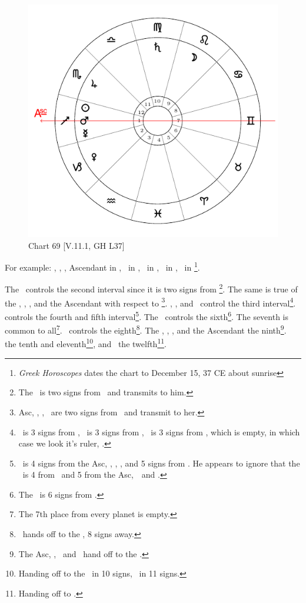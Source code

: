 \newpage
\begin{figure}
\centering
\vspace{0pt}
\includegraphics[width=.68\textwidth]{charts/5_11_1}
\caption{Chart 69 [V.11.1, GH L37]}
\label{fig:chart69}
\end{figure}

\noindent For example: \Sun, \Mars, \Mercury, Ascendant in \Sagittarius, \Moon\, in \Leo, \Saturn\, in \Virgo, \Jupiter\, in \Scorpio, \Venus\, in \Capricorn\footnote{\textit{Greek Horoscopes} dates the chart to December 15, 37 CE about sunrise}. 

The \Moon\, controls the second interval since it is two signs from \Saturn\footnote{The \Moon\, is two signs from \Saturn\, and transmits to him.}. The same is true of the \Sun, \Mars, \Mercury, and the Ascendant with respect to \Venus\footnote{Asc, \Sun, \Mars, \Mercury\, are two signs from \Venus\, and transmit to her.}. \Saturn, \Jupiter, and \Venus\, control the third interval\footnote{\Saturn\, is 3 signs from \Jupiter, \Jupiter\, is 3 signs from \Venus, \Venus\, is 3 signs from \Pisces, which is empty, in which case we look it's ruler, \Jupiter.}. \Saturn\, controls the fourth and fifth interval\footnote{\Saturn\, is 4 signs from the Asc, \Sun, \Mars, \Mercury, and 5 signs from \Venus. He appears to ignore that the \Moon\, is 4 from \Jupiter\, and 5 from the Asc, \Sun\, \Mercury\,and \Mars.}. The \Moon\, controls the sixth\footnote{The \Moon\, is 6  signs from \Venus.}. The seventh is common to all\footnote{The 7th place from every planet is empty.}. \Venus\, controls the eighth\footnote{\Venus\, hands off to the \Moon, 8 signs away.}. The \Sun, \Mars, \Mercury, and the Ascendant the ninth\footnote{The Asc, \Sun, \Mars\, and \Mercury\, hand off to the \Moon.}. \Jupiter\, the tenth and eleventh\footnote{Handing off to the \Moon\ in 10 signs, \Saturn\, in 11 signs.}, and \Venus\, the twelfth\footnote{Handing off to \Jupiter.}. 

